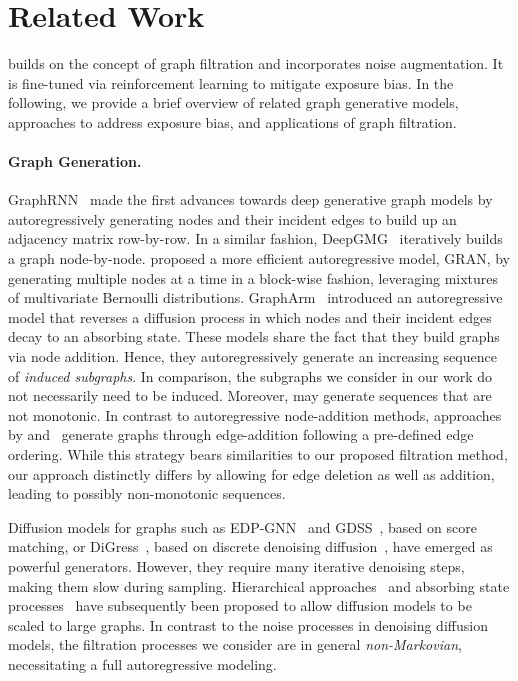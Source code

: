 \section{Related Work}
\label{sec:related-work}
\method builds on the concept of graph filtration and incorporates noise augmentation. It is fine-tuned via reinforcement learning to mitigate exposure bias. In the following, we provide a brief overview of related graph generative models, approaches to address exposure bias, and applications of graph filtration.

\paragraph{Graph Generation.} GraphRNN~\citep{you2018graphrnn} made the first advances towards deep generative graph models by autoregressively generating nodes and their incident edges to build up an adjacency matrix row-by-row. In a similar fashion, DeepGMG~\citep{li2018deepgmg} iteratively builds a graph node-by-node. \citet{lia2019gran} proposed a more efficient autoregressive model, GRAN, by generating multiple nodes at a time in a block-wise fashion, leveraging mixtures of multivariate Bernoulli distributions. 
GraphArm~\citep{kong2023grapharm} introduced an autoregressive model that reverses a diffusion process in which nodes and their incident edges decay to an absorbing state.
These models share the fact that they build graphs via node addition. Hence, they autoregressively generate an increasing sequence of \emph{induced subgraphs}. In comparison, the subgraphs we consider in our work do not necessarily need to be induced. Moreover, \method may generate sequences that are not monotonic. 
In contrast to autoregressive node-addition methods, approaches by \citet{goyal2020graphgen} and~\citet{bacciu2020edgebased} generate graphs through edge-addition following a pre-defined edge ordering. While this strategy bears similarities to our proposed filtration method, our approach distinctly differs by allowing for edge deletion as well as addition, leading to possibly non-monotonic sequences.

Diffusion models for graphs such as EDP-GNN~\citep{niu2020edpgnn} and GDSS~\citep{jo2022gdss}, based on score matching, or DiGress~\citep{vignac2023digress}, based on discrete denoising diffusion~\citep{austin2021d3pm}, have emerged as powerful generators. However, they require many iterative denoising steps, making them slow during sampling. Hierarchical approaches~\citep{bergmeister2024efficientscalable} and absorbing state processes~\citep{chen2023edge} have subsequently been proposed to allow diffusion models to be scaled to large graphs. In contrast to the noise processes in denoising diffusion models, the filtration processes we consider are in general \emph{non-Markovian}, necessitating a full autoregressive modeling.


